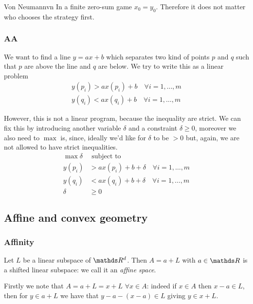 \documentclass[12pt]{extarticle}
\begin{document}
\begin{theorem}{Von Neumann}{vn}
	In a finite zero-sum game $x_0 = y_0$.
	Therefore it does not matter who chooses the strategy first.
\end{theorem}


\subsubsection{AA}

We want to find a line $y = ax + b$ which separates two kind of points $p$ and $q$
such that $p$ are above the line and $q$ are below.
We try to write this as a linear problem
\begin{align}
	y(p_i) > ax(p_i) + b \quad \forall i = 1, \dots, m \\
	y(q_i) < ax(q_i) + b \quad \forall i = 1, \dots, m
\end{align}

However, this is not a linear program, because the inequality are strict.
We can fix this by introducing another variable $\delta$ and a constraint $\delta \geq 0$,
moreover we also need to $\max$ is, since, ideally we'd like for $\delta$ to be $> 0$ but, again,
we are not allowed to have strict inequalities.
\begin{align}
	\max \delta & \text{ subject to}                                   \\
	y(p_i)      & > ax(p_i) + b + \delta \quad \forall i = 1, \dots, m \\
	y(q_i)      & < ax(q_i) + b + \delta \quad \forall i = 1, \dots, m \\
	\delta      & \geq 0
\end{align}

\subsection{Affine and convex geometry}
\subsubsection{Affinity}

Let $L$ be a linear subspace of $\R^d$.
Then $A = a + L$ with $a \in \R$ is a shifted linear subspace: we call it an \emph{affine space}.

Firstly we note that $A = a + L = x + L$ $\forall x \in A$: indeed if $x \in A$ then $x-a \in L$,
then for $y \in a + L$ we have that $y - a - (x - a) \in L$ giving $y \in x + L$.
\end{document}
